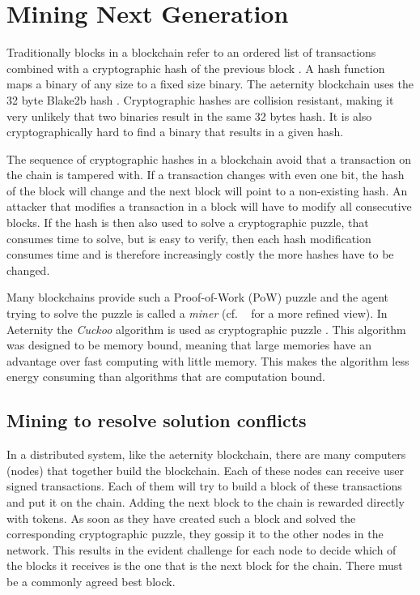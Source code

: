 \section{Mining Next Generation}
\label{sect:mining}

Traditionally blocks in a blockchain refer to an ordered list of
transactions combined with a cryptographic hash of the previous block
\cite{whatisablockchain,raikwar2019sok}. A hash function maps a
binary of any size to a fixed size binary. The aeternity blockchain
uses the 32 byte Blake2b hash \cite{aumasson2013blake2}. Cryptographic
hashes are collision resistant, making it very unlikely that two binaries
result in the same 32 bytes hash. It is also cryptographically hard
to find a binary that results in a given hash.

The sequence of cryptographic hashes in a blockchain avoid
that a transaction on the chain is tampered with. If a transaction
changes with even one bit, the hash of the block will change and the
next block will point to a non-existing hash. An attacker that
modifies a transaction in a block will have to modify all consecutive
blocks. If the hash is then also used to solve a cryptographic puzzle,
that consumes time to solve, but is easy to verify, then each hash
modification consumes time and is therefore increasingly costly the
more hashes have to be changed.

Many blockchains provide such a Proof-of-Work (PoW) puzzle and the agent
trying to solve the puzzle is called a \textit{miner} (cf. \ \cite{wang2018survey} for a more
refined view).  In Aeternity the \textit{Cuckoo}
algorithm is used as cryptographic puzzle \cite{Tromp2015CuckooCA}. This
algorithm was designed to be memory bound, meaning that large memories
have an advantage over fast computing with little memory. This makes
the algorithm less energy consuming than algorithms that are
computation bound.

\subsection{Mining to resolve solution conflicts}

In a distributed system, like the aeternity blockchain, there are many
computers (nodes) that together build the blockchain. Each of these nodes
can receive user signed transactions. Each of them will try to build a
block of these transactions and put it on the chain. Adding the next
block to the chain is rewarded directly with tokens. As soon as they
have created such a block and solved the corresponding cryptographic
puzzle, they gossip it to the other nodes in the network. This results
in the evident challenge for each node to decide  which of the blocks
it receives is the one that is the next block for the chain. There
must be a commonly agreed best block.

